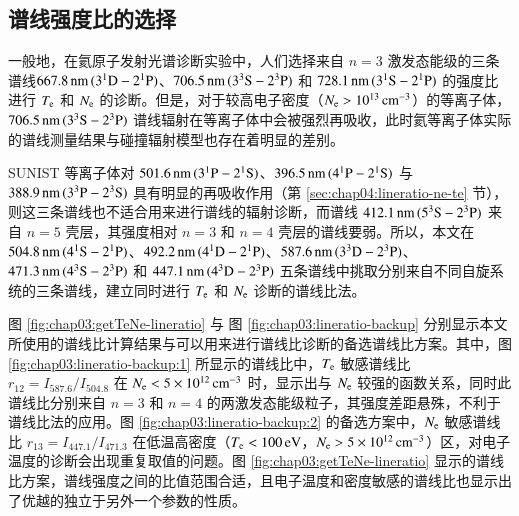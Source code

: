 \subsection{谱线强度比的选择}
\label{sec:chap03:lineratio-selection}

一般地，在氦原子发射光谱诊断实验中，人们选择来自 $n=3$ 激发态能级的三条谱线\pozhehao $667.8\,{\rm nm}\,(3^1{\rm D}-2^1{\rm P})$、$706.5\,{\rm nm}\,(3^3{\rm S}-2^3{\rm P})$ 和 $728.1\,{\rm nm}\,(3^1{\rm S}-2^1{\rm P})$ \pozhehao 的强度比进行 $T_{\rm e}$ 和 $N_{\rm e}$ 的诊断。但是，对于较高电子密度（$N_{\rm e}>10^{13}\,{\rm cm}^{-3}$）的等离子体，$706.5\,{\rm nm}\,(3^3{\rm S}-2^3{\rm P})$ 谱线辐射在等离子体中会被强烈再吸收\cite{boivin2001,Boivin2007}，此时氦等离子体实际的谱线测量结果与碰撞辐射模型也存在着明显的差别\cite{Schweer1992174,Brosda1993:Thesis,Sasaki:NIFS:DATA:346}。

SUNIST 等离子体对 $501.6\,{\rm nm}\,(3^1{\rm P}-2^1{\rm S})$、$396.5\,{\rm nm}\,(4^1{\rm P}-2^1{\rm S})$ 与 $388.9\,{\rm nm}\,(3^3{\rm P}-2^3{\rm S})$ 具有明显的再吸收作用（第 \ref{sec:chap04:lineratio-ne-te} 节），则这三条谱线也不适合用来进行谱线的辐射诊断，而谱线 $412.1\,{\rm nm}\,(5^3{\rm S}-2^3{\rm P})$ 来自 $n=5$ 壳层，其强度相对 $n=3$ 和 $n=4$ 壳层的谱线要弱。所以，本文在 $504.8\,{\rm nm}\,(4^1{\rm S}-2^1{\rm P})$、$492.2\,{\rm nm}\,(4^1{\rm D}-2^1{\rm P})$、$587.6\,{\rm nm}\,(3^3{\rm D}-2^3{\rm P})$、$471.3\,{\rm nm}\,(4^3{\rm S}-2^3{\rm P})$ 和 $447.1\,{\rm nm}\,(4^3{\rm D}-2^3{\rm P})$ 五条谱线中挑取分别来自不同自旋系统的三条谱线，建立同时进行 $T_{\rm e}$ 和 $N_{\rm e}$ 诊断的谱线比法。

图 \ref{fig:chap03:getTeNe-lineratio} 与 图 \ref{fig:chap03:lineratio-backup} 分别显示本文所使用的谱线比计算结果与可以用来进行谱线比诊断的备选谱线比方案。其中，图 \ref{fig:chap03:lineratio-backup:1} 所显示的谱线比中，$T_{\rm e}$ 敏感谱线比 $r_{12}=I_{587.6}/I_{504.8}$ 在 $N_{\rm e}<5\times10^{12}\,{\rm cm}^{-3}$ 时，显示出与 $N_{\rm e}$ 较强的函数关系，同时此谱线比分别来自 $n=3$ 和 $n=4$ 的两激发态能级粒子，其强度差距悬殊，不利于谱线比法的应用。图 \ref{fig:chap03:lineratio-backup:2} 的备选方案中，$N_{\rm e}$ 敏感谱线比 $r_{13}=I_{447.1}/I_{471.3}$ 在低温高密度（$T_{\rm e}<100\,{\rm eV}$，$N_{\rm e}>5\times10^{12}\,{\rm cm}^{-3}$）区，对电子温度的诊断会出现重复取值的问题。图 \ref{fig:chap03:getTeNe-lineratio} 显示的谱线比方案，谱线强度之间的比值范围合适，且电子温度和密度敏感的谱线比也显示出了优越的独立于另外一个参数的性质。


